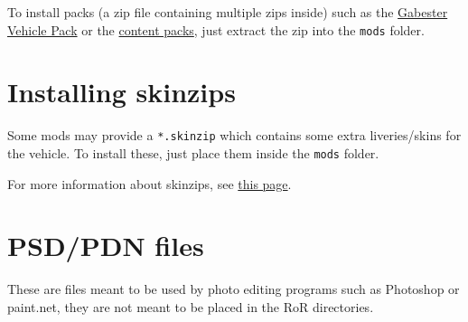 To install packs (a zip file containing multiple zips inside) such as
the
\href{http://forum.rigsofrods.org/resources/gabester-vehicle-pack.12/}{Gabester
Vehicle Pack} or the
\href{http://archives.rigsofrods.net/contentpacks/}{content packs}, just
extract the zip into the \texttt{mods} folder.

\hypertarget{installing-skinzips}{%
\section{Installing skinzips}\label{installing-skinzips}}

Some mods may provide a \texttt{*.skinzip} which contains some extra
liveries/skins for the vehicle. To install these, just place them inside
the \texttt{mods} folder.

For more information about skinzips, see
\href{/vehicle-creation/alternate-skins/}{this page}.

\hypertarget{psdpdn-files}{%
\section{PSD/PDN files}\label{psdpdn-files}}

These are files meant to be used by photo editing programs such as
Photoshop or paint.net, they are not meant to be placed in the RoR
directories.
